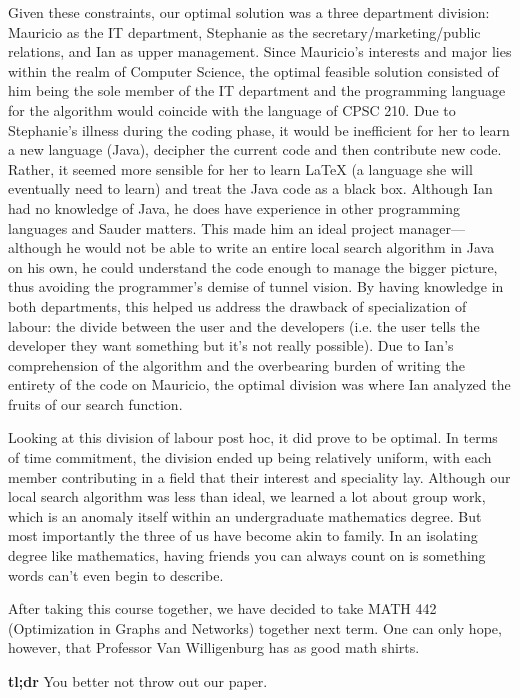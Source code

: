 \documentclass[11pt, oneside]{article}   	%
\begin{document}
Given these constraints, our optimal solution was a three department division: Mauricio as the IT department, Stephanie as the secretary/marketing/public relations, and Ian as upper management. Since Mauricio's interests and major lies within the realm of Computer Science, the optimal feasible solution consisted of him being the sole member of the IT department and the programming language for the algorithm would coincide with the language of CPSC 210. Due to Stephanie's illness during the coding phase, it would be inefficient for her to learn a new language (Java), decipher the current code and then contribute new code. Rather, it seemed more sensible for her to learn \LaTeX{} (a language she will eventually need to learn) and treat the Java code as a black box. Although Ian had no knowledge of Java, he does have experience in other programming languages and Sauder matters. This made him an ideal project manager---although he would not be able to write an entire local search algorithm in Java on his own, he could understand the code enough to manage the bigger picture, thus avoiding the programmer's demise of tunnel vision. By having knowledge in both departments, this helped us address the drawback of specialization of labour: the divide between the user and the developers (i.e. the user tells the developer they want something but it's not really possible). Due to Ian's comprehension of the algorithm and the overbearing burden of writing the entirety of the code on Mauricio, the optimal division was where Ian analyzed the fruits of our search function.

Looking at this division of labour post hoc, it did prove to be optimal. In terms of time commitment, the division ended up being relatively uniform, with each member contributing in a field that their interest and speciality lay. Although our local search algorithm was less than ideal, we learned a lot about group work, which is an anomaly itself within an undergraduate mathematics degree. But most importantly the three of us have become akin to family. In an isolating degree like mathematics, having friends you can always count on is something words can't even begin to describe.

After taking this course together, we have decided to take MATH 442 (Optimization in Graphs and Networks) together next term. One can only hope, however, that Professor Van Willigenburg has as good math shirts.

\vfill

\textbf{tl;dr} You better not throw out our paper.
\end{document}
